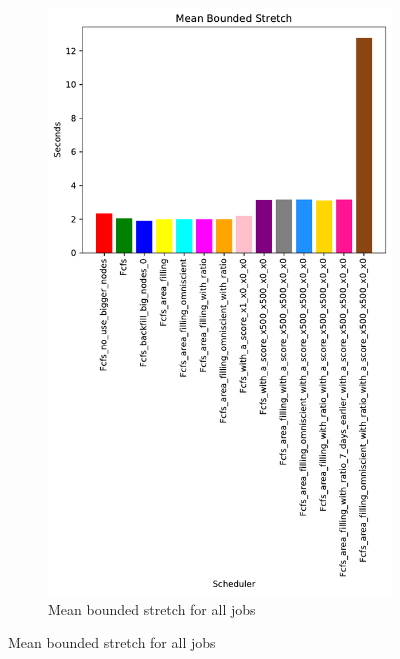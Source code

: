 \documentclass[a4paper]{article}
\begin{document}
\begin{figure}[H]\centering
\begin{subfigure}[b]{0.4\linewidth}\centering\includegraphics[width=0.7\linewidth]{MBSS/plot/Results_Size_And_Data_2022-01-17->2022-01-17_V9532_Mean_Stretch_With_a_Minimum_450_128_32_256_4_1024.pdf}\caption{Mean bounded stretch for all jobs}\label{45}\end{subfigure}

\end{figure}
\end{document}
